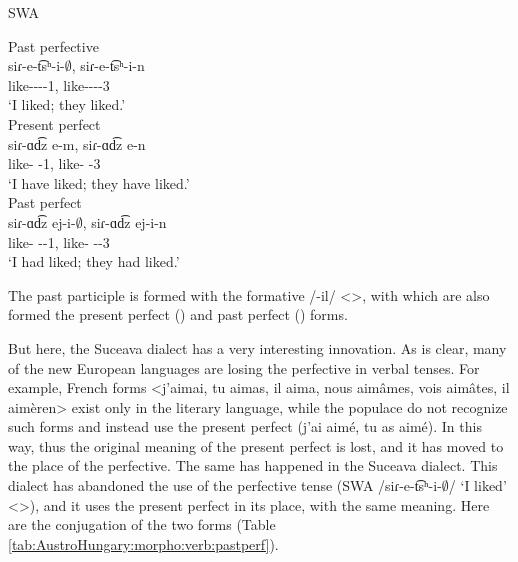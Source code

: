 \begin{exe}
	\ex SWA \label{sent:AustroHungary:morph:verb:past:swa}
	\begin{xlist}
		\ex Past perfective \\
		\gll siɾ-e-t͡sʰ-i-$\emptyset$, siɾ-e-t͡sʰ-i-n \\
		like-{\thgloss}-{\aor}-{\pst}-1{\sg}, like-{\thgloss}-{\aor}-{\pst}-3{\pl} \\
		\trans `I liked; they liked.' \label{sent:AustroHungary:morph:verb:past:swa:pstperfive}\\
		\ex Present perfect  \\
		\gll siɾ-ɑd͡z e-m, siɾ-ɑd͡z e-n \\
		like-{\rptcp} {\aux}-1{\sg}, like-{\rptcp} {\aux}-3{\pl} \\
		\trans `I have liked; they have liked.' \label{sent:AustroHungary:morph:verb:past:swa:presperf}\\
		\ex Past perfect  \\
		\gll siɾ-ɑd͡z ej-i-$\emptyset$, siɾ-ɑd͡z ej-i-n \\
		like-{\rptcp} {\aux}-{\pst}-1{\sg}, like-{\rptcp} {\aux}-{\pst}-3{\pl} \\
		\trans `I had liked; they had liked.' \label{sent:AustroHungary:morph:verb:past:swa:pstperf}\\
	\end{xlist}
\end{exe}



The past participle is formed with the formative /-il/ <>,  with which are also formed the present perfect () and past perfect () forms. 

But here, the Suceava dialect has a very interesting innovation. As is clear, many of the new European languages are losing the perfective in verbal tenses. For example, French forms <j'aimai, tu aimas, il aima, nous aimâmes, vois aimâtes, il aimèren> exist only in the literary language, while the populace do not recognize such forms and instead use the present perfect (j'ai aimé, tu as aimé). In this way, thus the original meaning of the present perfect is lost, and it has moved to the place of the perfective. The same has happened in the Suceava dialect. This dialect has abandoned the use of the perfective tense (SWA /siɾ-e-t͡sʰ-i-$\emptyset$/ `I liked' <>), and it uses the present perfect in its place, with the same meaning. Here are the conjugation of the two forms (Table \ref{tab:AustroHungary:morpho:verb:pastperf}). 

